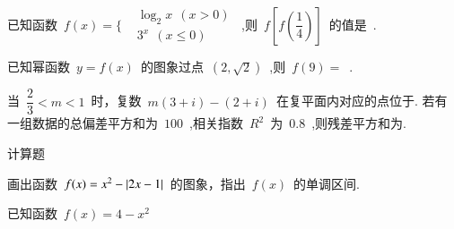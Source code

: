 \documentclass[UTF8,printbox,a4paper]{BHCexam}
\begin{document}
\begin{questions}
\tiankong
\question  已知函数~$f(x)=\Bigg \{\begin{aligned} 
&\log_2 x ~~  (x>0) \\ 
&3^x ~~  (x\leq 0)  
\end{aligned}$~,则~$f[f(\dfrac{1}{4})]$~的值是~.

\question 已知幂函数~$y=f(x)$~的图象过点~$(2,\sqrt{2})$~,则~$f(9)=$~.

\question 当~$\dfrac{2}{3} <m<1$~时，复数~$m(3+i)-(2+i)$~在复平面内对应的点位于.
\question 若有一组数据的总偏差平方和为~$100$~,相关指数~$R^2$~为~$0.8$~,则残差平方和为.


\jianda
\question 计算题
\vspace{6cm}	

\question[12] 画出函数~$f(x)=x^2-\left| 2x-1 \right|$~的图象，指出~$f(x)$~的单调区间.

\vspace{6cm}	

\question 已知函数~$f(x)=4-x^2$
\begin{parts}
\part[7] 试判断函数~$f(x)$~的奇偶性，并证明函数~$f(x)$~在~$[0,+\infty)$~是减函数；
\part[6] 解不等式~$f(x)\geq 3x$~.
\end{parts}
\vspace{8cm}	


\end{questions}
\end{document}
